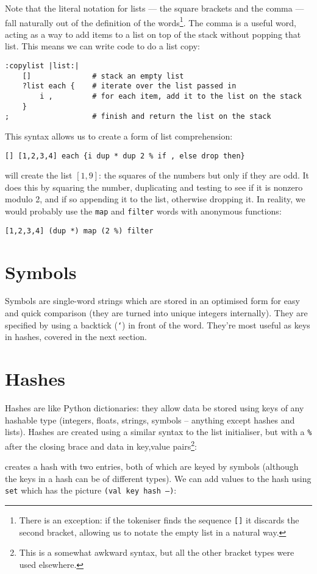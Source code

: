 Note that the literal notation for lists --- the square brackets and the
comma --- fall naturally out of the definition of the words\footnote{There
is an exception: if the tokeniser finds the sequence \texttt{[]} it discards
the second bracket, allowing us to notate the empty list in a natural way.}.
The comma
is a useful word, acting as a way to add items to a list on top of the stack
without popping that list. This means we can write code to do a list copy:
\begin{lstlisting}
:copylist |list:|
    []              # stack an empty list
    ?list each {    # iterate over the list passed in
        i ,         # for each item, add it to the list on the stack
    }
;                   # finish and return the list on the stack          
\end{lstlisting}
This syntax allows us to create a form of list comprehension:
\begin{lstlisting}
[] [1,2,3,4] each {i dup * dup 2 % if , else drop then}
\end{lstlisting}
will create the list $[1,9]$: the squares of the numbers but only 
if they are odd. It does this by squaring the number, duplicating and
testing to see if it is nonzero modulo 2, and if so appending it to the list,
otherwise dropping it. 
In reality, we would probably use the \texttt{map} and
\texttt{filter} words with anonymous functions:
\begin{lstlisting}
[1,2,3,4] (dup *) map (2 %) filter
\end{lstlisting}



\section{Symbols}
Symbols are single-word strings which are stored in an optimised form for easy
and quick comparison (they are turned into unique integers
internally). They are specified by using a backtick (\texttt{`}) in front of
the word. They're most useful as keys in hashes, covered in the next section.

\section{Hashes}
Hashes are like Python dictionaries: they allow data be stored using keys of any hashable type (integers, floats,
strings, symbols -- anything except hashes and lists). Hashes are created
using a similar syntax to the list initialiser, but with a \texttt{\%} after
the closing brace and data in key,value pairs\footnote{This is a somewhat
awkward syntax, but all the other bracket types were used elsewhere.}:
\indw{[\%]}
\end{v}
creates a hash with two entries, both of which are keyed by symbols (although
the keys in a hash can be of different types). We can add values to the hash
using \texttt{set} which has the picture \texttt{(val key hash --)}:

